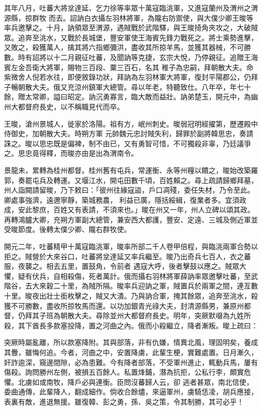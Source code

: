 \begin{pinyinscope}
 其年八月，吐蕃大將坌達延、乞力徐等率眾十萬寇臨洮軍，又進寇蘭州及渭州之渭源縣，掠群牧
 而去。詔訥白衣攝左羽林將軍，為隴右防禦使，與大僕少卿王晙等率兵邀擊之。十月，訥領眾至渭源，遇賊戰於武階驛，與王晙掎角夾攻之，大破賊眾。追奔至洮水，又戰於長城堡，豐安軍使王海賓先鋒力戰死之。將士乘勢進擊，又敗之，殺獲萬人，擒其將六指鄉彌洪，盡收其所掠羊馬，並獲其器械，不可勝數。時有詔將以十二月親征吐蕃，及聞訥等克捷，玄宗大悅，乃停親征。追贈王海賓左金吾衛大將軍，賜物三百段、粟三百石，名其
 稚子為忠嗣，拜朝散大夫。命紫微舍人倪若水往，即便敘錄功狀，拜訥為左羽林軍大將軍，復封平陽郡公，仍拜子暢朝散大夫。俄又充涼州鎮軍大總管。尋以年老，特聽致仕。八年卒，年七十餘，贈太常卿，謚曰昭定。訥沉勇寡言，臨大敵而益壯。訥弟楚玉，開元中，為幽州大都督府長史，以不稱職見代而卒。



 王晙，滄州景城人，徙家於洛陽。祖有方，岷州刺史。晙弱冠明經擢第，歷遷殿中侍御史，加朝散大夫。時朔方軍
 元帥魏元忠討賊失利，歸罪於副將韓思忠，奏請誅之。晙以思忠既是偏裨，制不由已，又有勇智可惜，不可獨殺非辜，乃廷議爭之。思忠竟得釋，而晙亦由是出為渭南令。



 景龍未，累轉為桂州都督。桂州舊有屯兵，常運衡、永等州糧以饋之，晙始改築羅郭，奏罷屯兵及轉運。又堰江水，開屯田數千頃，百姓賴之。尋上疏請歸鄉拜墓，州人詣闕請留晙，乃下敕曰：「彼州往緣寇盜，戶口凋殘，委任失材，乃令至此。卿處事強濟，遠邇寧靜，築城務農，
 利益已廣，隱括綏緝，復業者多。宜須政成，安此黎庶，百姓又有表請，不須來也。」晙在州又一年，州人立碑以頌其政。再轉鴻臚大卿，充朔方軍副大總管，兼安西大都護，豐安、定遠、三城及側近軍並受晙節度。後轉太僕少卿、隴右群牧使。



 開元二年，吐蕃精甲十萬寇臨洮軍，晙率所部二千人卷甲倍程，與臨洮兩軍合勢以拒之。賊營於大來谷口，吐蕃將坌達延又率兵繼至。晙乃出奇兵七百人，衣之蕃服，夜襲之。相去五里，置鼓角，令前者
 遇寇大呼，後者擊鼓以應之。賊眾大懼，疑有伏兵，自相殺傷，死者萬計。俄而攝右羽林將軍薛訥率眾邀擊吐蕃，至武階谷，去大來穀二十里，為賊所隔。晙率兵迎訥之軍，賊置兵於兩軍之間，連亙數十里。晙夜出壯士銜枚擊之，賊又大潰。乃與訥合軍，掩其餘眾，追奔至洮水，殺獲不可勝數，盡收所掠牧馬而還。以功加銀青光祿大夫，封清源縣男，兼原州都督，仍拜其子班為朝散大夫。尋除並州大都督府長史。明年，突厥默啜為九姓所
 殺，其下酋長多款塞投降，置之河曲之內。俄而小殺繼立，降者漸叛。晙上疏曰：



 突厥時屬亂離，所以款塞降附。其與部落，非有仇嫌，情異北風，理固明矣，養成其釁，雖悔何追。今者，河曲之中，安置降虜，此輩生梗，實難處置。日月漸久，奸詐逾深，窺邊間隙，必為患難。今有降者部落，不受軍州進止，輒動兵馬，屢有傷殺。詢問勝州左側，被損五百餘人。私置烽鋪，潛為抗拒，公私行李，頗實危懼。北虜如或南牧，降戶必與連衡。臣問沒蕃歸人云，卻
 逃者甚眾，南北信使，委曲通傳，此輩降人，翻成細作。倘收合餘燼，來逼軍州，虜騎恁凌，胡兵應接，表裏有敵，進退無援。雖復韓、彭之勇，孫、吳之策，令其制勝，其可必乎！




\end{pinyinscope}
